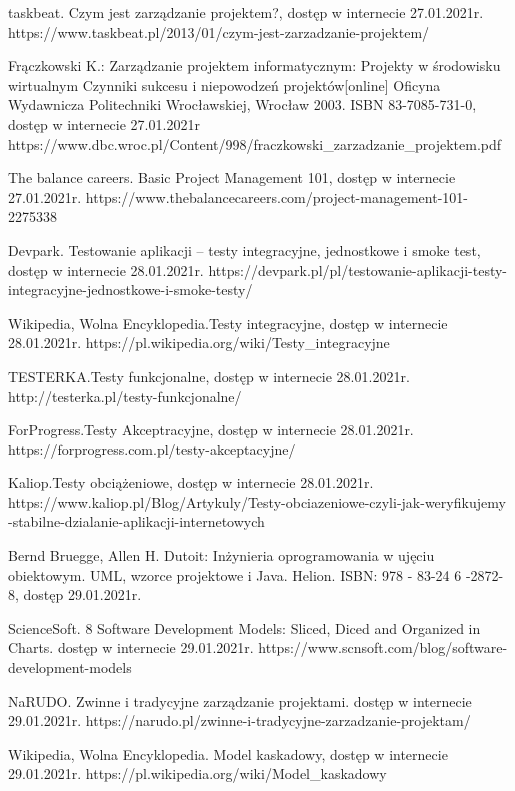 \documentclass[oneside,polski,logo]{amuthesis}
\begin{document}
\begin{thebibliography}{7}
taskbeat. Czym jest zarządzanie projektem?, dostęp w internecie 27.01.2021r.
https://www.taskbeat.pl/2013/01/czym-jest-zarzadzanie-projektem/

Frączkowski K.: Zarządzanie projektem informatycznym: 
Projekty w środowisku wirtualnym Czynniki sukcesu i niepowodzeń projektów[online]
Oficyna Wydawnicza Politechniki Wrocławskiej, Wrocław 2003.
ISBN 83-7085-731-0, dostęp w internecie 27.01.2021r
https://www.dbc.wroc.pl/Content/998/fraczkowski\_zarzadzanie\_projektem.pdf

The balance careers. Basic Project Management 101, dostęp w internecie 27.01.2021r.
https://www.thebalancecareers.com/project-management-101-2275338

Devpark. Testowanie aplikacji – testy integracyjne, jednostkowe i smoke test, dostęp w internecie 28.01.2021r.
https://devpark.pl/pl/testowanie-aplikacji-testy-integracyjne-jednostkowe-i-smoke-testy/

Wikipedia, Wolna Encyklopedia.Testy integracyjne, dostęp w internecie 28.01.2021r.
https://pl.wikipedia.org/wiki/Testy\_integracyjne

TESTERKA.Testy funkcjonalne, dostęp w internecie 28.01.2021r.
http://testerka.pl/testy-funkcjonalne/

ForProgress.Testy Akceptracyjne, dostęp w internecie 28.01.2021r.
https://forprogress.com.pl/testy-akceptacyjne/

Kaliop.Testy obciążeniowe, dostęp w internecie 28.01.2021r.
https://www.kaliop.pl/Blog/Artykuly/Testy-obciazeniowe-czyli-jak-weryfikujemy\\-stabilne-dzialanie-aplikacji-internetowych

Bernd Bruegge, Allen H. Dutoit: Inżynieria oprogramowania w ujęciu obiektowym. UML, wzorce projektowe i Java. Helion.
ISBN: 978 - 83-24 6 -2872-8, dostęp 29.01.2021r.

ScienceSoft. 8 Software Development Models: Sliced, Diced and Organized in Charts.  dostęp w internecie 29.01.2021r.
https://www.scnsoft.com/blog/software-development-models

NaRUDO. Zwinne i tradycyjne zarządzanie projektami. dostęp w internecie 29.01.2021r.
https://narudo.pl/zwinne-i-tradycyjne-zarzadzanie-projektam/

Wikipedia, Wolna Encyklopedia. Model kaskadowy, dostęp w internecie 29.01.2021r.
https://pl.wikipedia.org/wiki/Model\_kaskadowy


\end{thebibliography}
\end{document}
